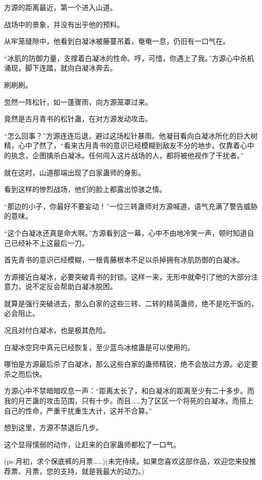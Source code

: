 \begin{this_body}
方源的距离最近，第一个进入山道。

战场中的景象，并没有出乎他的预料。

从牢笼缝隙中，他看到白凝冰被藤蔓吊着，奄奄一息，仍旧有一口气在。

“冰肌的防御力量，支撑着白凝冰的性命。哼，可惜，你遇上了我。”方源心中杀机涌现，脚下连踏，就向白凝冰奔去。

刷刷刷。

忽然一阵松针，如一蓬骤雨，向方源笼罩过来。

竟然是古月青书的松针蛊，在对方源发动攻击。

“怎么回事？”方源连连后退，避过这场松针暴雨。他凝目看向白凝冰所化的巨大树精，心中了然了，“看来古月青书的意识已经模糊到敌友不分的地步。仅靠着心中的执念，企图擒杀白凝冰。任何闯入这片战场的人，都将被他视作了干扰者。”

就在这时，山道那端出现了白家蛊师的身影。

看到这样的惨烈战场，他们的脸上都露出惊骇之情。

“那边的小子，你最好不要妄动！”一位三转蛊师对方源喊道，语气充满了警告威胁的意味。

“这个白凝冰还真是命大啊。”方源看到这一幕，心中不由地冷笑一声，顿时知道自己已经补不上这最后一刀。

首先青书的意识已经模糊，一根青藤根本不足以杀掉拥有冰肌防御的白凝冰。

方源接近白凝冰，必要突破青书的封锁。这样一来，无形中就牵引了他的大部分注意力，说不定反会帮助白凝冰脱困。

就算是强行突破进去，那么白家的这些三转、二转的精英蛊师，绝不是吃干饭的，必会阻止。

况且对付白凝冰，也是极其危险。

白凝冰空窍中真元已经恢复，至少蓝鸟冰棺蛊是可以使用的。

哪怕是方源最后杀了白凝冰，那么这些白家的蛊师精锐，绝不会放过方源。必定要杀之而后快。

方源心中不禁暗暗叹息一声：“距离太长了，和白凝冰的距离至少有二十多步。而我的月芒蛊的攻击范围，只有十步。而且……为了区区一个将死的白凝冰，而搭上自己的性命，严重干扰重生大计，这并不合算。”

想到这里，方源不禁退后几步。

这个显得懦弱的动作，让赶来的白家蛊师都松了一口气。

(ps:月初，求个保底裤的月票……)(未完待续。如果您喜欢这部作品，欢迎您来投推荐票、月票，您的支持，就是我最大的动力。)

\end{this_body}

